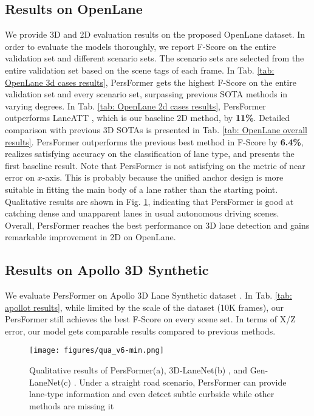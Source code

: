 \documentclass[runningheads]{llncs}
\begin{document}
\subsection{Results on OpenLane}
We provide 3D and 2D evaluation results on the proposed OpenLane dataset. 
In order to evaluate the models thoroughly, we report F-Score on the entire validation set and different scenario sets.
The scenario sets are selected from the entire validation set based on the scene tags of each frame.
In Tab. \ref{tab: OpenLane 3d cases results}, PersFormer gets the highest F-Score on the entire validation set and every scenario set, surpassing previous SOTA methods in varying degrees.
In Tab. \ref{tab: OpenLane 2d cases results}, PersFormer outperforms LaneATT \cite{tabelini2021keep}, which is our baseline 2D method, by \textbf{11\%}.
Detailed comparison with previous 3D SOTAs is presented in Tab. \ref{tab: OpenLane overall results}.
PersFormer outperforms the previous best method in F-Score by \textbf{6.4\%}, realizes satisfying accuracy on the classification of lane type, and presents the first baseline result.
Note that PersFormer is not satisfying on the metric of near error on $x$-axis. This is probably because the unified anchor design is more suitable in fitting the main body of a lane rather than the starting point.
Qualitative results are shown in Fig. \ref{fig:qualitative},
indicating that PersFormer is good at catching dense and unapparent lanes in usual autonomous driving scenes.
Overall, PersFormer reaches the best performance on 3D lane detection and gains remarkable improvement in 2D on OpenLane.



\subsection{Results on Apollo 3D Synthetic}
We evaluate PersFormer on Apollo 3D Lane Synthetic dataset \cite{guo2020gen}.
In Tab. \ref{tab: apollot results}, while limited by the scale of the dataset (10K frames), our PersFormer still achieves the best F-Score on every scene set.
In terms of X/Z error, our model gets comparable results compared to previous methods.






\begin{figure}[t!]
    \centering
    \texttt{[image: figures/qua\_v6-min.png]}
    \caption{Qualitative results of PersFormer(a), 3D-LaneNet(b) \cite{Garnett_2019_ICCV}, and Gen-LaneNet(c) \cite{guo2020gen}. Under a straight road scenario, PersFormer can provide lane-type information and even detect subtle curbside while other methods are missing it}
    \label{fig:qualitative}
\end{figure}
\end{document}
